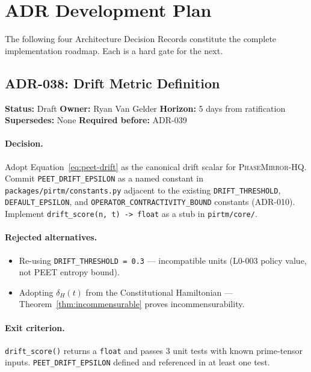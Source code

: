 \documentclass[11pt,letterpaper]{article}
\theoremstyle{definition}
\theoremstyle{remark}
\newcommand{\pmhq}{\textsc{PhaseMirror-HQ}}
\begin{document}
\section{ADR Development Plan}

The following four Architecture Decision Records constitute the
complete implementation roadmap. Each is a hard gate for the next.

\subsection{ADR-038: Drift Metric Definition}

\begin{mdframed}[linecolor=blue!40,linewidth=1pt,backgroundcolor=blue!2]
\textbf{Status:} Draft \quad
\textbf{Owner:} Ryan Van Gelder \quad
\textbf{Horizon:} 5 days from ratification \\
\textbf{Supersedes:} None \quad
\textbf{Required before:} ADR-039
\end{mdframed}

\paragraph{Decision.}
Adopt Equation~\eqref{eq:peet-drift} as the canonical drift scalar
for \pmhq{}. Commit \texttt{PEET\_DRIFT\_EPSILON} as a named
constant in \texttt{packages/pirtm/constants.py} adjacent to the
existing \texttt{DRIFT\_THRESHOLD}, \texttt{DEFAULT\_EPSILON},
and \texttt{OPERATOR\_CONTRACTIVITY\_BOUND} constants (ADR-010).
Implement \texttt{drift\_score(n, t) -> float} as a stub in
\texttt{pirtm/core/}.

\paragraph{Rejected alternatives.}
\begin{itemize}[leftmargin=2em,noitemsep]
  \item Re-using \texttt{DRIFT\_THRESHOLD = 0.3} --- incompatible
        units (L0-003 policy value, not PEET entropy bound).
  \item Adopting \(\delta_H(t)\) from the Constitutional Hamiltonian
        --- Theorem~\ref{thm:incommensurable} proves incommensurability.
\end{itemize}

\paragraph{Exit criterion.}
\texttt{drift\_score()} returns a \texttt{float} and passes 3
unit tests with known prime-tensor inputs. \texttt{PEET\_DRIFT\_EPSILON}
defined and referenced in at least one test.
\end{document}
